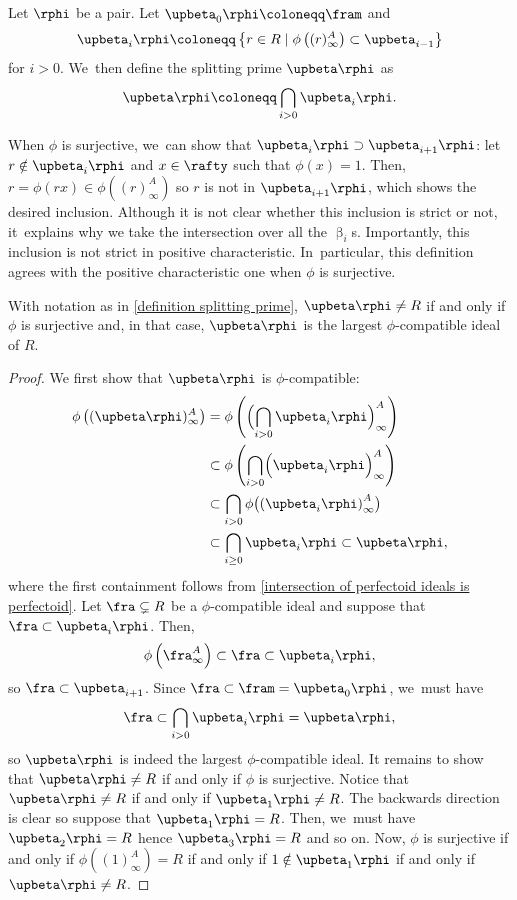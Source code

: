 \begin{definition}\label{definition splitting prime}
Let $\rphi$ be a pair. Let $\upbeta_0\rphi\coloneqq \fram$ and
\[
\upbeta_i\rphi\coloneqq \left\{r\in R\mid \phi\left((r)^A_\infty\right)\subset\upbeta_{i-1}\right\}
\]
for $i>0$. We~then define the splitting prime $\upbeta\rphi$ as
\[
\upbeta\rphi\coloneqq \bigcap_{i>0}\upbeta_i\rphi.
\]
\end{definition}

\begin{remark}
When $\phi$ is surjective, we~can show that $\upbeta_i\rphi\supset\upbeta_{i+1}\rphi$: let $r\notin \upbeta_i\rphi$ and $x\in \rafty$ such that $\phi(x)=1$. Then, $r=\phi(rx)\in \phi\left((r)_\infty^A\right)$ so $r$ is not in $\upbeta_{i+1}\rphi$, which shows the desired inclusion. Although it is not clear whether this inclusion is strict or not, it~explains why we take the intersection over all the $\upbeta_i$s. Importantly, this inclusion is not strict in positive characteristic. In~particular, this definition agrees with the positive characteristic one when $\phi$ is surjective.
\end{remark}

\begin{proposition}\label{basic ppties splitting prime}
With notation as in \autoref{definition splitting prime}, $\upbeta\rphi\neq R$ if and only if $\phi$ is surjective and, in that case, $\upbeta\rphi$ is the largest $\phi$-compatible ideal of $R$.
\end{proposition}

\begin{proof}
We first show that $\upbeta\rphi$ is $\phi$-compatible:
\begin{align*}
\phi\left((\upbeta\rphi)^A_\infty\right)&=\phi\left(\Bigl(\bigcap_{i>0} \upbeta_i\rphi\Bigr)^A_\infty\right)\\
&\subset \phi\left(\bigcap_{i>0} \Bigl(\upbeta_i\rphi \Bigr)^A_\infty \right) \\
&\subset \bigcap_{i>0} \phi\bigl( \left(\upbeta_i\rphi\right)^A_\infty\bigr) \\
&\subset \bigcap_{i\geq 0} \upbeta_i\rphi \subset \upbeta\rphi,
\end{align*}
where the first containment follows from \autoref{intersection of perfectoid ideals is perfectoid}.
Let $\fra\subsetneq R$ be a $\phi$-compatible ideal and suppose that $\fra\subset\upbeta_i\rphi$. Then,
\[
\phi\left(\fra^A_\infty\right)\subset \fra\subset \upbeta_i\rphi,
\]
so $\fra\subset\upbeta_{i+1}$. Since $\fra\subset\fram=\upbeta_0\rphi$, we~must have
\[
\fra\subset \bigcap_{i>0}\upbeta_i\rphi= \upbeta\rphi,
\]
so $\upbeta\rphi$ is indeed the largest $\phi$-compatible ideal. It remains to show that $\upbeta\rphi\neq\nobreak R$ if and only if $\phi$ is surjective. Notice that $\upbeta\rphi\neq R$ if and only if $\upbeta_1\rphi\neq R$. The backwards direction is clear so suppose that $\upbeta_1\rphi=R$. Then, we~must have $\upbeta_2\rphi=R$ hence $\upbeta_3\rphi=R$ and so on. Now, $\phi$ is surjective if and only if $\phi\left((1)^A_\infty\right)=R$ if and only if $1\notin \upbeta_1\rphi$ if and only if $\upbeta\rphi\neq R$.
\end{proof}

